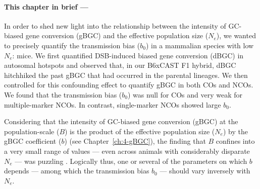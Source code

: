 {\small{} \itshape{}

\paragraph{This chapter in brief —}

In order to shed new light into the relationship between the intensity of GC-biased gene conversion (gBGC) and the effective population size ($N_e$), we wanted to precisely quantify the transmission bias ($b_0$) in a mammalian species with low $N_e$: mice.
We first quantified DSB-induced biased gene conversion (dBGC) in autosomal hotspots and observed that, in our B6xCAST F1 hybrid, dBGC hitchhiked the past gBGC that had occurred in the parental lineages.
We then controlled for this confounding effect to quantify gBGC in both COs and NCOs.
We found that the transmission bias ($b_0$) was null for COs and very weak for multiple-marker NCOs. 
In contrast, single-marker NCOs showed large $b_0$.



}

\newpage

Considering that the intensity of GC-biased gene conversion (gBGC) at the population-scale ($B$) is the product of the effective population size ($N_e$) by the gBGC coefficient ($b$) (see Chapter~\ref{ch:4-gBGC}), the finding that $B$ confines into a very small range of values — even across animals with considerably disparate $N_e$ — was puzzling \citep{galtier2018codon}.
Logically thus, one or several of the parameters on which $b$ depends — among which the transmission bias $b_0$ — should vary inversely with $N_e$.

